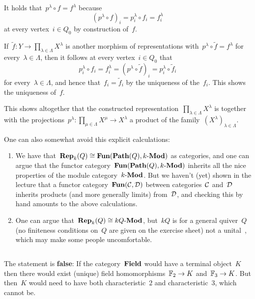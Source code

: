 It holds that~$p^\lambda \circ f = f^\lambda$ because
\[
    (p^\lambda \circ f)_i
  = p^\lambda_i \circ f_i
  = f^\lambda_i
\]
at every vertex~$i \in Q_0$ by construction of~$f$.

If~$\tilde{f} \colon Y \to \prod_{\lambda \in \Lambda} X^\lambda$ is another morphism of representations with~$p^\lambda \circ \tilde{f} = f^\lambda$ for every~$\lambda \in \Lambda$, then it follows at every vertex~$i \in Q_0$ that
\[
    p^\lambda_i \circ f_i
  = f^\lambda_i
  = (p^\lambda \circ \tilde{f})_i
  = p^\lambda_i \circ \tilde{f}_i
\]
for every~$\lambda \in \Lambda$, and hence that~$f_i = \tilde{f}_i$ by the uniqueness of the~$f_i$.
This shows the uniqueness of~$f$.

This shows altogether that the constructed representation~$\prod_{\lambda \in \Lambda} X^\lambda$ is together with the projections~$p^\lambda \colon \prod_{\mu \in \Lambda} X^\mu \to X^\lambda$ a product of the family~$(X^\lambda)_{\lambda \in \Lambda}$.


\begin{remark}
  One can also somewhat avoid this explicit calculations:
  \begin{enumerate}
    \item
      We have that~$\mathbf{Rep}_{k}(Q) \cong \mathbf{Fun}(\mathbf{Path}(Q), \text{$k$-$\mathbf{Mod}$})$ as categories, and one can argue that the functor category~$\mathbf{Fun}(\mathbf{Path}(Q), \text{$k$-$\mathbf{Mod}$})$ inherits all the nice properties of the module category~$\text{$k$-$\mathbf{Mod}$}$.
      But we haven’t (yet) shown in the lecture that a functor category~$\mathbf{Fun}(\mathcal{C}, \mathcal{D})$ between categories~$\mathcal{C}$ and~$\mathcal{D}$ inherits products (and more generally limits) from~$\mathcal{D}$, and checking this by hand amounts to the above calculations.
    \item
      One can argue that~$\mathbf{Rep}_{k}(Q) \cong \text{$kQ$-$\mathbf{Mod}$}$, but~$kQ$ is for a general quiver~$Q$ (no finiteness conditions on~$Q$ are given on the exercise sheet) not a unital~{\kalg}, which may make some people uncomfortable.
  \end{enumerate}
\end{remark}





\subsection{}

The statement is \textbf{false}:
If the category~$\mathbf{Field}$ would have a terminal object~$K$ then there would exist (unique) field homomorphisms~$\mathbb{F}_2 \to K$ and~$\mathbb{F}_3 \to K$.
But then~$K$ would need to have both characteristic~$2$ and characteristic~$3$, which cannot be.




